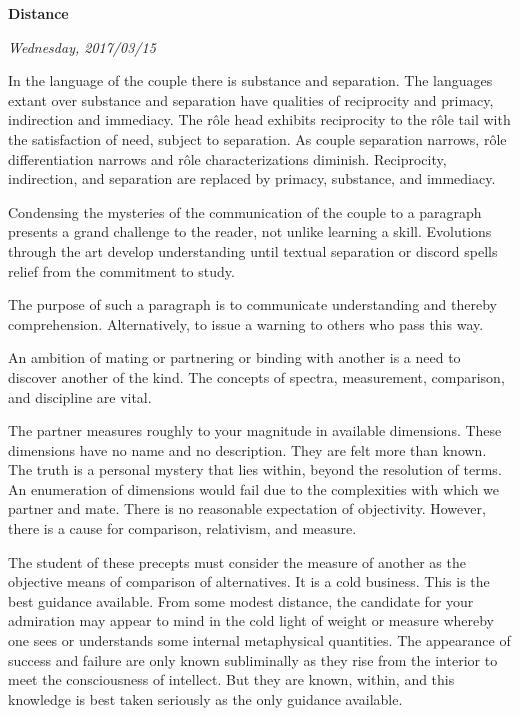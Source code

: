 

\centerline{\bf Distance}
\centerline{\it Wednesday, 2017/03/15}



\break

﻿In the language of the couple there is substance and separation.  The
languages extant over substance and separation have qualities of
reciprocity and primacy, indirection and immediacy.  The r\^{o}le head
exhibits reciprocity to the r\^{o}le tail with the satisfaction of
need, subject to separation.  As couple separation narrows, r\^{o}le
differentiation narrows and r\^{o}le characterizations diminish.
Reciprocity, indirection, and separation are replaced by primacy,
substance, and immediacy.

Condensing the mysteries of the communication of the couple to a
paragraph presents a grand challenge to the reader, not unlike
learning a skill.  Evolutions through the art develop understanding
until textual separation or discord spells relief from the commitment
to study.

The purpose of such a paragraph is to communicate understanding and
thereby comprehension.  Alternatively, to issue a warning to others
who pass this way.

\break

﻿An ambition of mating or partnering or binding with another is a need
to discover another of the kind.  The concepts of spectra,
measurement, comparison, and discipline are vital.

The partner measures roughly to your magnitude in available
dimensions.  These dimensions have no name and no description.  They
are felt more than known.  The truth is a personal mystery that lies
within, beyond the resolution of terms.  An enumeration of dimensions
would fail due to the complexities with which we partner and mate.
There is no reasonable expectation of objectivity.  However, there is
a cause for comparison, relativism, and measure.

The student of these precepts must consider the measure of another as
the objective means of comparison of alternatives.  It is a cold
business.  This is the best guidance available.  From some modest
distance, the candidate for your admiration may appear to mind in the
cold light of weight or measure whereby one sees or understands some
internal metaphysical quantities.  The appearance of success and
failure are only known subliminally as they rise from the interior to
meet the consciousness of intellect.  But they are known, within, and
this knowledge is best taken seriously as the only guidance available.

